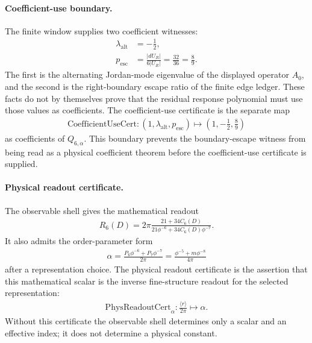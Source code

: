 \paragraph{Coefficient-use boundary.}
The finite window supplies two coefficient witnesses:
$$
\begin{aligned}
\lambda_{\mathrm{alt}}&=-\frac{1}{2},\\
p_{\mathrm{esc}}&=\frac{|dU_R|}{6|U_R|}=\frac{32}{36}=\frac{8}{9}.
\end{aligned}
$$
The first is the alternating Jordan-mode eigenvalue of the displayed operator $A_0$, and the second is the right-boundary escape ratio of the finite edge ledger.  These facts do not by themselves prove that the residual response polynomial must use those values as coefficients.  The coefficient-use certificate is the separate map
$$
\begin{aligned}
\mathrm{CoefficientUseCert}:
\left(1,\lambda_{\mathrm{alt}},p_{\mathrm{esc}}\right)
\longmapsto
\left(1,-\frac{1}{2},\frac{8}{9}\right)
\end{aligned}
$$
as coefficients of $Q_{6,\alpha}$.  This boundary prevents the boundary-escape witness from being read as a physical coefficient theorem before the coefficient-use certificate is supplied.

\paragraph{Physical readout certificate.}
The observable shell gives the mathematical readout
$$
\begin{aligned}
R_6(D)
=
2\pi
\frac{21+34C_6(D)}
{21\phi^{-6}+34C_6(D)\phi^{-7}}.
\end{aligned}
$$
It also admits the order-parameter form
$$
\begin{aligned}
\alpha
=
\frac{P_6\phi^{-6}+P_7\phi^{-7}}{2\pi}
=
\frac{\phi^{-5}+m\phi^{-8}}{4\pi}
\end{aligned}
$$
after a representation choice.  The physical readout certificate is the assertion that this mathematical scalar is the inverse fine-structure readout for the selected representation:
$$
\begin{aligned}
\mathrm{PhysReadoutCert}_{\alpha}:
\frac{\langle r\rangle}{2\pi}\longmapsto \alpha .
\end{aligned}
$$
Without this certificate the observable shell determines only a scalar and an effective index; it does not determine a physical constant.

